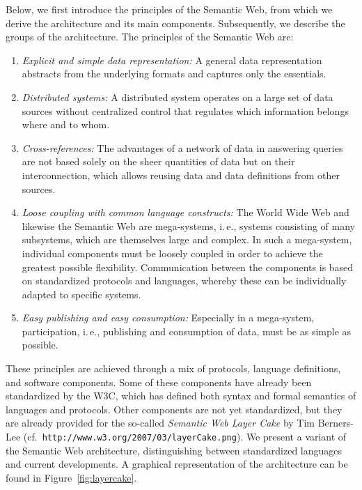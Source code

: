 \documentclass[a4paper,USenglish]{tgdk-v2021}
\begin{document}
Below, we first introduce the principles of the Semantic Web, from which we derive the architecture and its main components.
Subsequently, we describe the groups of the architecture.
The principles of the Semantic Web are:

\begin{enumerate}
\item \emph{Explicit and simple data representation:}
A general data representation abstracts from the underlying formats and captures only the essentials.

\item \emph{Distributed systems:}
A distributed system operates on a large set of data sources without centralized control that regulates which information belongs where and to whom.

\item \emph{Cross-references:}
The advantages of a network of data in answering queries are not based solely on the sheer quantities of data but on their interconnection, which allows reusing data and data definitions from other sources.

\item \emph{Loose coupling with common language constructs:}
The World Wide Web and likewise the Semantic Web are mega-systems, i.\,e., systems consisting of many subsystems, which are themselves large and complex.
In such a mega-system, individual components must be loosely coupled in order to achieve the greatest possible flexibility.
Communication between the components is based on standardized protocols and languages, whereby these can be individually adapted to specific systems. 

\item \emph{Easy publishing and easy consumption:}
Especially in a mega-system, participation, i.\,e., publishing and consumption of data, must be as simple as possible.
\end{enumerate}
These principles are achieved through a mix of protocols, language definitions, and software components.
Some of these components have already been standardized by the W3C, which has defined both syntax and formal semantics of languages and protocols. 
Other components are not yet standardized, but they are already provided for the so-called \emph{Semantic Web Layer Cake} by Tim Berners-Lee (cf.~{\tt http://www.w3.org/2007/03/layerCake.png}).
We present a variant of the Semantic Web architecture, distinguishing between standardized languages and current developments.
A graphical representation of the architecture can be found in Figure~\ref{fig:layercake}.
\end{document}
